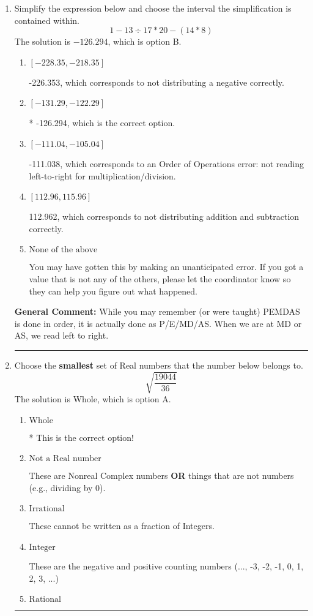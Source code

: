 \documentclass{extbook}[14pt]
\newcommand{\litem}[1]{\item #1

\rule{\textwidth}{0.4pt}}
\begin{document}
\begin{enumerate}\litem{
Simplify the expression below and choose the interval the simplification is contained within.
\[ 1 - 13 \div 17 * 20 - (14 * 8) \]The solution is \( -126.294 \), which is option B.\begin{enumerate}[label=\Alph*.]
\item \( [-228.35, -218.35] \)

 -226.353, which corresponds to not distributing a negative correctly.
\item \( [-131.29, -122.29] \)

* -126.294, which is the correct option.
\item \( [-111.04, -105.04] \)

 -111.038, which corresponds to an Order of Operations error: not reading left-to-right for multiplication/division.
\item \( [112.96, 115.96] \)

 112.962, which corresponds to not distributing addition and subtraction correctly.
\item \( \text{None of the above} \)

 You may have gotten this by making an unanticipated error. If you got a value that is not any of the others, please let the coordinator know so they can help you figure out what happened.
\end{enumerate}

\textbf{General Comment:} While you may remember (or were taught) PEMDAS is done in order, it is actually done as P/E/MD/AS. When we are at MD or AS, we read left to right.
}
\litem{
Choose the \textbf{smallest} set of Real numbers that the number below belongs to.
\[ \sqrt{\frac{19044}{36}} \]The solution is \( \text{Whole} \), which is option A.\begin{enumerate}[label=\Alph*.]
\item \( \text{Whole} \)

* This is the correct option!
\item \( \text{Not a Real number} \)

These are Nonreal Complex numbers \textbf{OR} things that are not numbers (e.g., dividing by 0).
\item \( \text{Irrational} \)

These cannot be written as a fraction of Integers.
\item \( \text{Integer} \)

These are the negative and positive counting numbers (..., -3, -2, -1, 0, 1, 2, 3, ...)
\item \( \text{Rational} \)


\end{enumerate}}
\end{enumerate}
\end{document}
